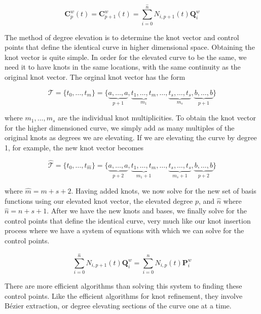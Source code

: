 \begin{equation}
\label{eqn:degreeelevation}
\mathbf{C}_p^w(t) = \mathbf{C}_{p+1}^w(t) = \sum^{\hat{n}}_{i=0} N_{i,p+1}(t) \mathbf{Q}_i^w
\end{equation}

The method of degree elevation is to determine the knot vector and control points that define the identical curve in higher dimensional space.  Obtaining the knot vector is quite simple. In order for the elevated curve to be the same, we need it to have knots in the same locations, with the same continuity as the original knot vector.  The orginal knot vector has the form

\begin{equation}
	\mathcal{T} = \{t_0,\ldots,t_m\} = \{\underbrace{a,\ldots,a}_{p+1},\underbrace{t_1,\ldots,t_m}_{m_1},\ldots,\underbrace{t_s,\ldots,t_s}_{m_s},\underbrace{b,\ldots,b}_{p+1} \}
\end{equation}

where \(m_1,\ldots,m_s\) are the individual knot multiplicities. To obtain the knot vector for the higher dimensioned curve, we simply add as many multiples of the original knots as degrees we are elevating. If we are elevating the curve by degree 1, for example, the new knot vector becomes

\begin{equation}
\hat{\mathcal{T}} = \{t_0,\ldots,t_{\hat{m}}\} = \{\underbrace{a,\ldots,a}_{p+2},\underbrace{t_1,\ldots,t_m}_{m_1+1},\ldots,\underbrace{t_s,\ldots,t_s}_{m_s+1},\underbrace{b,\ldots,b}_{p+2} \}
\end{equation}

where \(\hat{m} = m+s+2\).  Having added knots, we now solve for the new set of basis functions using our elevated knot vector, the elevated degree \(p\), and \(\hat{n}\) where \(\hat{n} = n+s+1\).  After we have the new knots and bases, we finally solve for the control points that define the identical curve, very much like our knot insertion process where we have a system of equations with which we can solve for the control points.

\begin{equation}
\sum^{\hat{n}}_{i=0} N_{i,p+1}(t) \mathbf{Q}_i^w = \sum^{n}_{i=0} N_{i,p}(t) \mathbf{P}_i^w
\end{equation}

There are more efficient algorithms than solving this system to finding these control points. Like the efficient algorithms for knot refinement, they involve Bézier extraction, or degree elevating sections of the curve one at a time.

